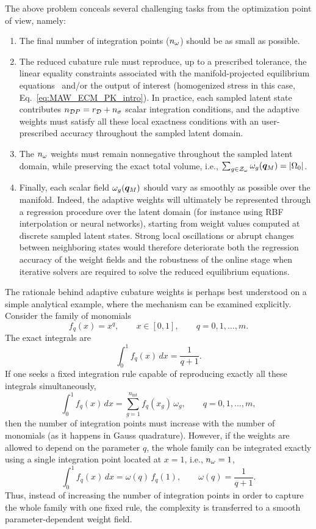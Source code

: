 \documentclass[11pt,a4paper]{article}
\begin{document}
The above problem conceals several challenging tasks from the optimization
point of view, namely:
\begin{enumerate}

 \item \label{item:MAW_sparsity} The final number of integration points (\(n_{\omega}\)) should be as small
as possible.

\item \label{item:MAW_equa} The reduced cubature rule must reproduce, up to a prescribed tolerance,
the linear equality constraints associated with the manifold-projected
equilibrium equations~ and/or the output of interest (homogenized stress in this case, Eq.~\ref{eq:MAW_ECM_PK_intro}). In practice, each sampled
latent state contributes \(n_{\mathcal{D}P}=r_{\mathcal{D}}+n_{\sigma}\) scalar integration
conditions, and the adaptive weights must satisfy all these local exactness
conditions with an user-prescribed accuracy throughout the sampled latent domain.

\item \label{item:positive}  The \(n_{\omega}\) weights must remain nonnegative throughout the sampled
latent domain, while preserving the exact total volume, i.e.,
\(\sum_{g\in\mathcal{Z}_{\omega}}\omega_{g}(\bm{q}_M)=|\Omega_0|\).

\item \label{item:smooth}   Finally, each scalar field \(\omega_{g}(\bm{q}_M)\) should vary as smoothly
as possible over the manifold. Indeed, the adaptive weights will ultimately be
represented through a regression procedure over the latent domain (for instance
using RBF interpolation or neural networks), starting from weight values
computed at discrete sampled latent states. Strong local oscillations or
abrupt changes between neighboring states would therefore deteriorate both the
regression accuracy of the weight fields and the robustness of the online stage
when iterative solvers are required to solve the reduced equilibrium equations.

\end{enumerate}


The rationale behind adaptive cubature weights is perhaps best understood on a
simple analytical example, where the mechanism can be examined explicitly. Consider the family of monomials
\[
    f_q(x)=x^q,
    \qquad
    x\in[0,1],
    \qquad
    q=0,1,\ldots,m .
\]
The exact integrals are
\[
    \int_0^1 f_q(x)\,dx
    =
    \frac{1}{q+1}.
\]
If one seeks a fixed integration rule capable of reproducing exactly all these
integrals simultaneously,
\[
    \int_0^1 f_q(x)\,dx
    =
    \sum_{g=1}^{n_{\mathrm{int}}}
    f_q(x_g)\,\omega_g,
    \qquad
    q=0,1,\ldots,m ,
\]
then the number of integration points must increase with the number of
monomials (as it happens in Gauss quadrature). However, if the weights are allowed to depend on the parameter \(q\), the whole
family can be integrated exactly using a single integration point located at
\(x=1\), i.e., \(n_{\omega}=1\),
\[
    \int_0^1 f_q(x)\,dx
    =
    \omega(q)\,f_q(1),
    \qquad
    \omega(q)=\frac{1}{q+1}.
\]
Thus, instead of increasing the number of integration points in order to
capture the whole family with one fixed rule, the complexity is transferred to
a smooth parameter-dependent weight field.
\end{document}
